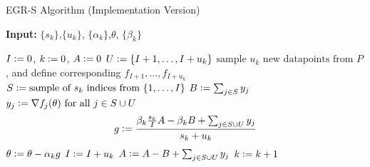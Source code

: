 \documentclass[11pt]{article}
\newcommand{\defeqq}{\vcentcolon=}
\begin{document}
%
%

\begin{algorithm}
	[H] 
	\caption{EGR-S Algorithm (Implementation Version)}
	\label{alg:egr-s-i}
	{\bf Input:} $\{ s_k\} $,$\{ u_k \}$, $\{ \alpha_k \}$,$\theta$, $\{\beta_k \}$
	\begin{algorithmic}
		[1] 
		\State $I \defeqq 0$, $k \defeqq 0$, $A \defeqq 0$
		\Loop 
		\State $U \defeqq \{I+1,\ldots, I+u_k \}$ 
		\State $\mbox{sample } u_k \mbox{ new datapoints from } P $, and define corresponding $f_{I+1},\ldots, f_{I+u_k}$ 
		\State $S  \defeqq  \mbox{sample of } s_k \mbox{ indices from }\{ 1, \ldots ,I\}$ 
		\State $B \defeqq \sum_{j \in S} y_j$ 
		\State $y_j \defeqq  \nabla f_j(\theta) \mbox{ for all } j \in S\cup U$ 
		\State 
		\begin{equation}
			g \defeqq  \frac{\beta_k \frac{s_k}{I} A - \beta_k B +\sum_{j \in S\cup U}y_j}{s_k+u_k} 
		\end{equation}
		\State $\theta  \defeqq  \theta - \alpha_k g$ 
		\State $I  \defeqq  I +u_k$ 
		\State $A  \defeqq  A - B+ \sum_{j \in S\cup U}y_j$ 
		\State $k \defeqq k+1$ 
		\EndLoop 
	\end{algorithmic}
\end{algorithm}
\end{document}
